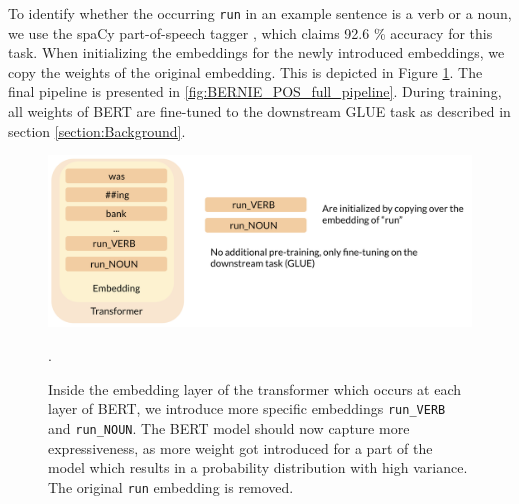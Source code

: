 \documentclass[a4paper,12pt,oneside,openright]{report}
\begin{document}
To identify whether the occurring \Verb#run# in an example sentence is a verb or a noun, we use the spaCy part-of-speech tagger \cite{spacyb}, which claims 92.6 \% accuracy for this task.
When initializing the embeddings for the newly introduced embeddings, we copy the weights of the original embedding.
This is depicted in Figure \ref{fig:BERnie_POS_initialization}.
The final pipeline is presented in \ref{fig:BERNIE_POS_full_pipeline}.
During training, all weights of BERT are fine-tuned to the downstream GLUE task as described in section \ref{section:Background}.

\begin{figure}
	\center
  \includegraphics[width=0.8\linewidth]{./assets/experiments/pipeline_model_BERnie_POS_initialization.png}
  \caption{Inside the embedding layer of the transformer which occurs at each layer of BERT, we introduce more specific embeddings \texttt{run\_VERB} and \texttt{run\_NOUN}. The BERT model should now capture more expressiveness, as more weight got introduced for a part of the model which results in a probability distribution with high variance. The original \texttt{run} embedding is removed.}.
  \label{fig:BERnie_POS_initialization}
\end{figure}
\end{document}
